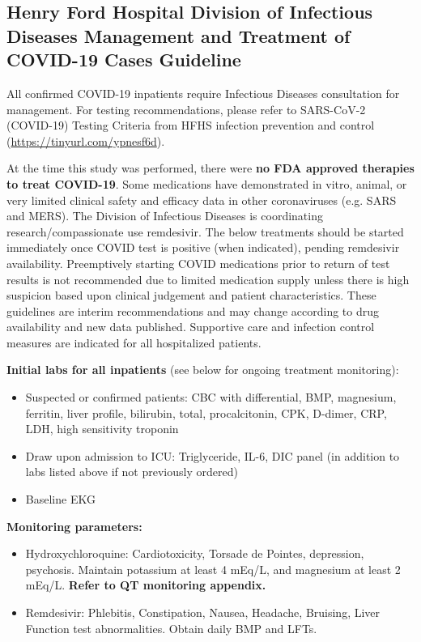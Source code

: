 \documentclass[Minh_PhD_thesis.tex]{subfiles}
\begin{document}
\subsection{Henry Ford Hospital Division of Infectious Diseases Management and Treatment of COVID-19 Cases Guideline}


All confirmed COVID-19 inpatients require Infectious Diseases consultation for management. For testing recommendations, please refer to SARS-CoV-2 (COVID-19) Testing Criteria from HFHS infection prevention and control (\url{https://tinyurl.com/ypnesf6d}).


At the time this  study was performed, there were \textbf{no FDA approved therapies to treat COVID-19}. Some medications have demonstrated in vitro, animal, or very limited clinical safety and efficacy data in other coronaviruses (e.g. SARS and MERS). The Division of Infectious Diseases is coordinating research/compassionate use remdesivir. The below treatments should be started immediately once COVID test is positive (when indicated), pending remdesivir availability.  Preemptively starting COVID medications prior to return of test results is not recommended due to limited medication supply unless there is high suspicion based upon clinical judgement and patient characteristics.  These guidelines are interim recommendations and may change according to drug availability and new data published. Supportive care and infection control measures are indicated for all hospitalized patients.

\textbf{Initial labs for all inpatients} (see below for ongoing treatment monitoring): 
\begin{itemize}
\item Suspected or confirmed patients: CBC with differential, BMP, magnesium, ferritin, liver profile, bilirubin, total, procalcitonin, CPK, D-dimer, CRP, LDH, high sensitivity troponin
\item Draw upon admission to ICU: Triglyceride, IL-6, DIC panel (in addition to labs listed above if not previously ordered)
\item Baseline EKG
\end{itemize}

\textbf{Monitoring parameters:}
\begin{itemize}
\item Hydroxychloroquine: Cardiotoxicity, Torsade de Pointes, depression, psychosis. Maintain potassium at least 4 mEq/L, and magnesium at least 2 mEq/L. \textbf{Refer to QT monitoring appendix.} 
\item Remdesivir: Phlebitis, Constipation, Nausea, Headache, Bruising, Liver Function test abnormalities. Obtain daily BMP and LFTs. 
\end{itemize}
\end{document}

